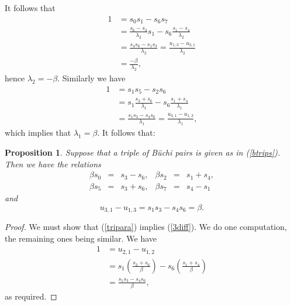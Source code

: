 \documentclass[letterpaper,10pt]{amsart}
\newtheorem{proposition}[theorem]{Proposition}
\theoremstyle{definition}
\numberwithin{equation}{section}
\begin{document}
It follows that 
\begin{align*} 1 & = s_0 s_1 - s_6 s_7 \\
& = \frac{s_6 - s_3}{\lambda_2} s_1 - s_6 \frac{s_1 - s_4}{\lambda_2} \\
& = \frac{s_4 s_6 - s_1 s_3}{\lambda_2} = \frac{u_{1,3} - u_{3,1}}{\lambda_2} \\
& = \frac{-\beta}{\lambda_2}, 
\end{align*} 
hence $\lambda_2 = -\beta$. Similarly we have 
\begin{align*} 1 & = s_1 s_5 - s_2 s_6 \\
& = s_1 \frac{s_3 + s_6}{\lambda_1} - s_6 \frac{s_1 + s_4}{\lambda_1} \\
& = \frac{s_1 s_3 - s_4 s_6}{\lambda_1} = \frac{u_{3,1} - u_{1,3}}{\lambda_1}, 
\end{align*}
which implies that $\lambda_1 = \beta$. It follows that: 

\begin{proposition} \label{tri-p} Suppose that a triple of B\"{u}chi pairs is given as in (\ref{btrips}). Then we have the relations 
\begin{equation} \label{tripara} \begin{matrix} \beta s_0 & = & s_3 - s_6, & \beta s_2 & = & s_1 + s_4, \\
\beta s_5 & = & s_3 + s_6, & \beta s_7 & = & s_4 - s_1 
\end{matrix} 
\end{equation}
and
\[u_{3,1} - u_{1,3} = s_1 s_3 - s_4 s_6 = \beta.\]
\end{proposition}

\begin{proof} We must show that (\ref{tripara}) implies (\ref{3diff}). We do one computation, the remaining ones being similar. We have 
\begin{align*} 1 & = u_{2,1} - u_{1,2} \\
& = s_1 \left(\frac{s_3 + s_6}{\beta} \right) - s_6 \left(\frac{s_1 + s_4}{\beta} \right) \\
& = \frac{s_1 s_3 - s_4 s_6}{\beta},
\end{align*}
as required. 
\end{proof}
\end{document}
